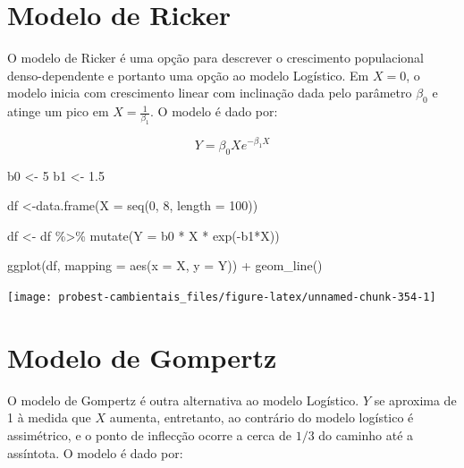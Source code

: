 \documentclass[
]{book}
\newenvironment{Shaded}{\begin{snugshade}}{\end{snugshade}}
\newcommand{\AttributeTok}[1]{\textcolor[rgb]{0.77,0.63,0.00}{#1}}
\newcommand{\DecValTok}[1]{\textcolor[rgb]{0.00,0.00,0.81}{#1}}
\newcommand{\FloatTok}[1]{\textcolor[rgb]{0.00,0.00,0.81}{#1}}
\newcommand{\FunctionTok}[1]{\textcolor[rgb]{0.00,0.00,0.00}{#1}}
\newcommand{\NormalTok}[1]{#1}
\newcommand{\OtherTok}[1]{\textcolor[rgb]{0.56,0.35,0.01}{#1}}
\newcommand{\SpecialCharTok}[1]{\textcolor[rgb]{0.00,0.00,0.00}{#1}}
\begin{document}
\hypertarget{modelo-de-ricker}{%
\section{Modelo de Ricker}\label{modelo-de-ricker}}

O modelo de Ricker é uma opção para descrever o crescimento populacional denso-dependente e portanto uma opção ao modelo Logístico. Em \(X = 0\), o modelo inicia com crescimento linear com inclinação dada pelo parâmetro \(\beta_0\) e atinge um pico em \(X = \frac{1}{\beta_1}\). O modelo é dado por:

\[Y = \beta_0 X e^{-\beta_1 X}\]

\begin{Shaded}
\begin{Highlighting}[]
\NormalTok{b0 }\OtherTok{\textless{}{-}} \DecValTok{5}
\NormalTok{b1 }\OtherTok{\textless{}{-}} \FloatTok{1.5}

\NormalTok{df }\OtherTok{\textless{}{-}}\FunctionTok{data.frame}\NormalTok{(}\AttributeTok{X =} \FunctionTok{seq}\NormalTok{(}\DecValTok{0}\NormalTok{, }\DecValTok{8}\NormalTok{, }\AttributeTok{length =} \DecValTok{100}\NormalTok{))}

\NormalTok{df }\OtherTok{\textless{}{-}}\NormalTok{ df }\SpecialCharTok{\%\textgreater{}\%} \FunctionTok{mutate}\NormalTok{(}\AttributeTok{Y =}\NormalTok{ b0 }\SpecialCharTok{*}\NormalTok{ X }\SpecialCharTok{*} \FunctionTok{exp}\NormalTok{(}\SpecialCharTok{{-}}\NormalTok{b1}\SpecialCharTok{*}\NormalTok{X))}

\FunctionTok{ggplot}\NormalTok{(df, }\AttributeTok{mapping =} \FunctionTok{aes}\NormalTok{(}\AttributeTok{x =}\NormalTok{ X, }\AttributeTok{y =}\NormalTok{ Y)) }\SpecialCharTok{+}
  \FunctionTok{geom\_line}\NormalTok{()}
\end{Highlighting}
\end{Shaded}

\begin{center}\texttt{[image: probest-cambientais\_files/figure-latex/unnamed-chunk-354-1]} \end{center}

\hypertarget{modelo-de-gompertz}{%
\section{Modelo de Gompertz}\label{modelo-de-gompertz}}

O modelo de Gompertz é outra alternativa ao modelo Logístico. \(Y\) se aproxima de 1 à medida que \(X\) aumenta, entretanto, ao contrário do modelo logístico é assimétrico, e o ponto de inflecção ocorre a cerca de \(1/3\) do caminho até a assíntota. O modelo é dado por:
\end{document}
